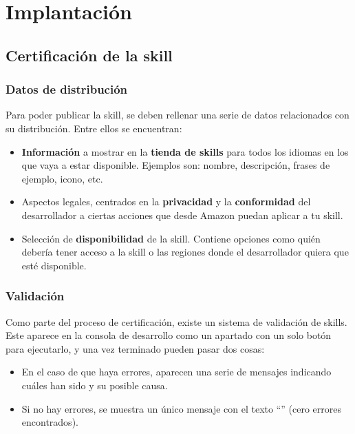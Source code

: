 \documentclass[11pt,spanish,listoffigures,listoftables,table,hyphens,dvipsnames]{tfgetsinf}
\newcommand{\fe}[1]{\foreign{english}{#1}}
\begin{document}
\chapter{Implantación}
\label{capitulo:implantacion}

\section{Certificación de la skill}

\subsection{Datos de distribución}

Para poder publicar la skill, se deben rellenar una serie de datos relacionados con su distribución. Entre ellos se encuentran:

\begin{itemize}
   \item \textbf{Información} a mostrar en la \textbf{tienda de skills} para todos los idiomas en los que vaya a estar disponible. Ejemplos son: nombre, descripción, frases de ejemplo, icono, etc.
   \item Aspectos legales, centrados en la \textbf{privacidad} y la \textbf{conformidad} del desarrollador a ciertas acciones que desde Amazon puedan aplicar a tu skill.
   \item Selección de \textbf{disponibilidad} de la skill. Contiene opciones como quién debería tener acceso a la skill o las regiones donde el desarrollador quiera que esté disponible.
\end{itemize}

\subsection{Validación}
\label{seccion:validacion}

Como parte del proceso de certificación, existe un sistema de validación de skills. Este aparece en la consola de desarrollo como un apartado con un solo botón para ejecutarlo, y una vez terminado pueden pasar dos cosas: 

\begin{itemize}
   \item En el caso de que haya errores, aparecen una serie de mensajes indicando cuáles han sido y su posible causa.
   \item Si no hay errores, se muestra un único mensaje con el texto ``\fe{Zero errors found}'' (cero errores encontrados).
\end{itemize}
\end{document}
